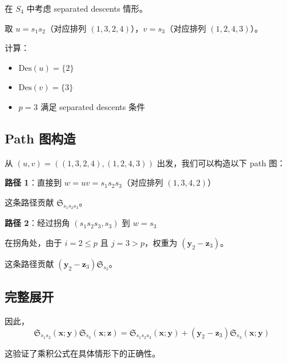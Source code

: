在 $S_4$ 中考虑 separated descents 情形。

取 $u = s_1 s_2$（对应排列 $(1,3,2,4)$），$v = s_3$（对应排列 $(1,2,4,3)$）。

计算：
\begin{itemize}
\item $\mathrm{Des}(u) = \{2\}$
\item $\mathrm{Des}(v) = \{3\}$
\item $p = 3$ 满足 separated descents 条件
\end{itemize}

\subsection*{Path 图构造}

从 $(u,v) = ((1,3,2,4), (1,2,4,3))$ 出发，我们可以构造以下 path 图：

\textbf{路径 1}：直接到 $w = u v = s_1 s_2 s_3$（对应排列 $(1,3,4,2)$）

这条路径贡献 $\mathfrak{S}_{s_1 s_2 s_3}$。

\textbf{路径 2}：经过拐角 $(s_1 s_2 s_3, s_3)$ 到 $w = s_3$

在拐角处，由于 $i=2 \leq p$ 且 $j=3 > p$，权重为 $(\mathbf{y}_2 - \mathbf{z}_3)$。

这条路径贡献 $(\mathbf{y}_2 - \mathbf{z}_3) \mathfrak{S}_{s_3}$。

\subsection*{完整展开}

因此，
$$\mathfrak{S}_{s_1 s_2}(\mathbf{x};\mathbf{y}) \mathfrak{S}_{s_3}(\mathbf{x};\mathbf{z}) = \mathfrak{S}_{s_1 s_2 s_3}(\mathbf{x};\mathbf{y}) + (\mathbf{y}_2 - \mathbf{z}_3) \mathfrak{S}_{s_3}(\mathbf{x};\mathbf{y})$$

这验证了乘积公式在具体情形下的正确性。

\endinput
